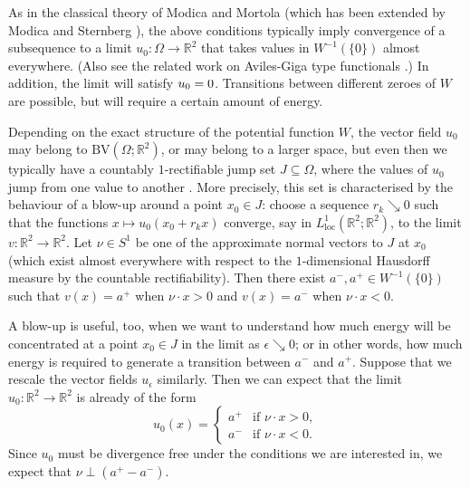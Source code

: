 \documentclass[a4paper]{article}
\newcommand{\R}{\mathbb{R}}
\newcommand{\loc}{\mathrm{loc}}
\newcommand{\BV}{\mathrm{BV}}
\let\div\relax\DeclareMathOperator{\div}{div}
\theoremstyle{definition}
\theoremstyle{remark}
\begin{document}
As in the classical theory of Modica and Mortola \cite{Modica-Mortola:77.1, Modica-Mortola:77.2} (which has been extended by Modica \cite{Modica:87.1} and
Sternberg \cite{Sternberg:88}),
the above conditions typically imply
convergence of a subsequence to a limit $u_0 \colon \Omega \to \R^2$ that
takes values in $W^{-1}(\{0\})$ almost everywhere. (Also see
the related work on Aviles-Giga type functionals
\cite{Ambrosio-DeLellis-Mantegazza:99, DeSimone-Kohn-Mueller-Otto:01, Jabin-Perthame:01, Jabin-Otto-Perthame:02}.)
In addition, the limit will satisfy
$\div u_0 = 0$. Transitions between different zeroes of $W$ are possible, but will require
a certain amount of energy.

Depending on the exact structure of the potential function $W$, the
vector field $u_0$ may belong to
$\BV(\Omega; \R^2)$, or may belong to a larger space, but even then we typically have a countably $1$-rectifiable jump
set $J \subseteq \Omega$, where the values of $u_0$ jump from one value to another \cite{DeLellis-Otto:03}.
More precisely, this set is characterised by the behaviour of a blow-up
around a point $x_0 \in J$: choose a sequence $r_k \searrow 0$
such that the functions $x \mapsto u_0(x_0 + r_k x)$ converge, say in $L_\loc^1(\R^2; \R^2)$,
to the limit $v \colon \R^2 \to \R^2$. Let $\nu \in S^1$ be one of the approximate normal
vectors to $J$ at $x_0$ (which exist almost everywhere with respect to the
$1$-dimensional Hausdorff measure by the countable rectifiability).
Then there exist $a^-, a^+ \in W^{-1}(\{0\})$ such that $v(x) = a^+$ when
$\nu \cdot x > 0$ and $v(x) = a^-$ when $\nu \cdot x < 0$.

A blow-up is useful, too, when we want to understand how much energy
will be concentrated at a point $x_0 \in J$ in the limit as
$\epsilon \searrow 0$; or in other words, how much energy is required to
generate a transition between $a^-$ and $a^+$. Suppose that we rescale
the vector fields $u_\epsilon$ similarly. Then we can expect that the limit
$u_0 \colon \R^2 \to \R^2$ is already of the form
\begin{equation} \label{eq:limiting-vector-field}
u_0(x) = \begin{cases}
a^+ & \text{if $\nu \cdot x > 0$}, \\
a^- & \text{if $\nu \cdot x < 0$}.
\end{cases}
\end{equation}
Since $u_0$ must be divergence free under the conditions we are interested in,
we expect that $\nu \perp (a^+ - a^-)$.
\end{document}
